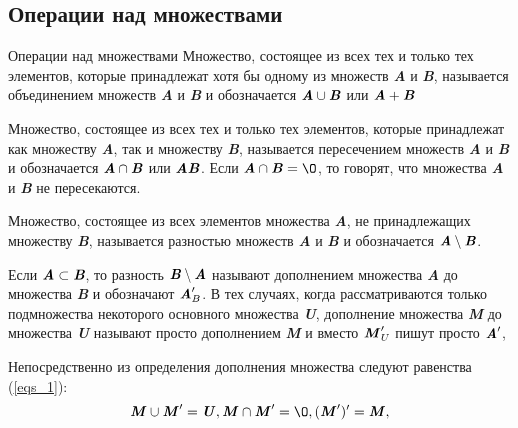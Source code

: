 \documentclass{beamer}
\begin{document}
    \subsection{Операции над множествами}
    \begin{frame}{Операции над множествами}
        \fontsize{10}{8}\selectfont Множество, состоящее из всех тех и только тех элементов, которые принадлежат хотя бы одному из множеств \textit{\textbf{A}} и \textit{\textbf{B}}, называется
        объединением множеств \textit{\textbf{A}} и \textit{\textbf{B}} и обозначается $\textbf{\textit{A}} \cup \textbf{\textit{B}}$ или $\textbf{\textit{A}} + \textbf{\textit{B}}$

        Множество, состоящее из всех тех и только тех элементов, которые принадлежат как множеству \textit{\textbf{A}}, так и множеству \textit{\textbf{B}}, называется пересечением множеств \textit{\textbf{A}} и \textit{\textbf{B}} и обозначается $\textbf{\textit{A}} \cap \textbf{\textit{B}}$ или $\textbf{\textit{A}}\textbf{\textit{B}}$. Если $\textbf{\textit{A}} \cap \textbf{\textit{B}} = \O$, то говорят, что множества \textit{\textbf{A}} и \textit{\textbf{B}} не пересекаются.

        Множество, состоящее из всех элементов множества \textit{\textbf{A}}, не принадлежащих множеству \textit{\textbf{B}}, называется разностью множеств \textit{\textbf{A}} и \textit{\textbf{B}} и обозначается $\textbf{\textit{A}} \setminus \textbf{\textit{B}}$.

        Если $\textit{\textbf{A}} \subset \textit{\textbf{B}}$, то разность $\textbf{\textit{B}} \setminus \textbf{\textit{A}}$ называют дополнением множества \textit{\textbf{A}} до множества \textit{\textbf{B}} и обозначают $\textbf{\textit{A}}_B^\prime$.
        В тех случаях, когда рассматриваются только подмножества некоторого основного множества \textit{\textbf{U}}, дополнение множества \textit{\textbf{M}} до множества \textit{\textbf{U}} называют просто дополнением \textit{\textbf{M}} и вместо $\textbf{\textit{M}}_U^\prime$ пишут просто $\textbf{\textit{A}}^\prime$,

        Непосредственно из определения дополнения множества следуют равенства (\ref{eqs_1}):
        \begin{equation}
            \label{eqs_1}
            \textbf{\textit{M}} \cup \textbf{\textit{M}}^\prime = \textbf{\textit{U}}, \textbf{\textit{M}} \cap \textbf{\textit{M}}^\prime = \O, (\textbf{\textit{M}}^\prime)^\prime = \textbf{\textit{M}},
        \end{equation}

    \end{frame}
\end{document}
